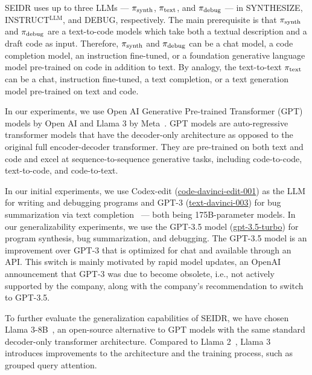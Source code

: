 SEIDR uses up to three LLMs --- $ \pi_\text{synth} $, $ \pi_\text{text} $, and $ \pi_\text{debug} $ ---
in SYNTHESIZE, INSTRUCT$^{\text{LLM}}$, and DEBUG, respectively. 
The main prerequisite is that $ \pi_\text{synth} $ and $ \pi_\text{debug} $ are a text-to-code models which take both a textual description and a draft code as input.
Therefore, $ \pi_\text{synth} $ and $ \pi_\text{debug} $ can be a chat model, a code completion model, an instruction fine-tuned, or a foundation generative language model pre-trained on code in addition to text. 
By analogy, the text-to-text $ \pi_\text{text} $ can be a chat, instruction fine-tuned, a text completion, or a text generation model pre-trained on text and code.

In our experiments, we use Open AI Generative Pre-trained Transformer (GPT) models by Open AI and Llama 3 by Meta~\cite{roziereCodeLlamaOpen2024}. 
GPT models are auto-regressive transformer models that have the decoder-only architecture as opposed to the original full encoder-decoder transformer.
They are pre-trained on both text and code and excel at sequence-to-sequence generative tasks, including code-to-code, text-to-code, and code-to-text.

In our initial experiments, we use Codex-edit (\href{https://openai.com/index/gpt-3-edit-insert/}{code-davinci-edit-001})
as the LLM for writing and debugging programs and GPT-3 (\href{https://platform.openai.com/docs/deprecations}{text-davinci-003}) for bug summarization via text completion~\cite{brown2020:language} --- both being 175B-parameter models.
In our generalizability experiments, we use the GPT-3.5 model (\href{https://platform.openai.com/docs/models/gpt-3-5-turbo}{gpt-3.5-turbo}) for program synthesis, bug summarization, and debugging. 
The GPT-3.5 model is an improvement over GPT-3 that is optimized for chat and available through an API.
This switch is mainly motivated by rapid model updates, an OpenAI announcement that GPT-3 was due to become obsolete, i.e., not actively supported by the company, along with the company's recommendation to switch to GPT-3.5. 

To further evaluate the generalization capabilities of SEIDR, we have chosen Llama 3-8B~\cite{roziereCodeLlamaOpen2024}, an open-source alternative to GPT models with the same standard decoder-only transformer architecture. 
Compared to Llama 2~\cite{touvron2023:llama}, Llama 3 introduces improvements to the architecture and the training process, such as grouped query attention.

